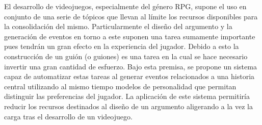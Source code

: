 \begin{resumen}

El desarrollo de videojuegos, especialmente del género RPG, supone el uso en conjunto de una serie de tópicos que llevan al límite los recursos disponibles para la consolidación del mismo. Particularmente el diseño del argumento y la generación de eventos en torno a este suponen una tarea sumamente importante pues tendrán un gran efecto en la experiencia del jugador. Debido a esto la construcción de un guión (o guiones) es una tarea en la cual se hace necesario invertir una gran cantidad de esfuerzo. Bajo esta premisa, se propone un sistema capaz de automatizar estas tareas al generar eventos relacionados a una historia central utilizando al mismo tiempo modelos de personalidad que permitan distinguir las preferencias del jugador. La aplicación de este sistema permitiría reducir los recursos destinados al diseño de un argumento aligerando a la vez la carga tras el desarrollo de un videojuego.


\end{resumen}
